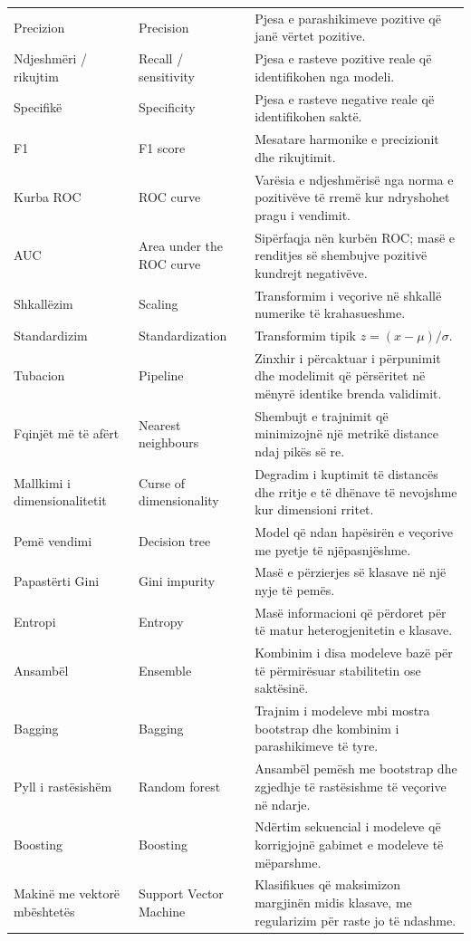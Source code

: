 \documentclass[12pt,a4paper,oneside]{book}
\begin{document}
\begin{longtable}{p{}p{}p{}}
Precizion & Precision & Pjesa e parashikimeve pozitive që janë vërtet pozitive.\\
Ndjeshmëri / rikujtim & Recall / sensitivity & Pjesa e rasteve pozitive reale që identifikohen nga modeli.\\
Specifikë & Specificity & Pjesa e rasteve negative reale që identifikohen saktë.\\
F1 & F1 score & Mesatare harmonike e precizionit dhe rikujtimit.\\
Kurba ROC & ROC curve & Varësia e ndjeshmërisë nga norma e pozitivëve të rremë kur ndryshohet pragu i vendimit.\\
AUC & Area under the ROC curve & Sipërfaqja nën kurbën ROC; masë e renditjes së shembujve pozitivë kundrejt negativëve.\\
Shkallëzim & Scaling & Transformim i veçorive në shkallë numerike të krahasueshme.\\
Standardizim & Standardization & Transformim tipik $z=(x-\mu)/\sigma$.\\
Tubacion & Pipeline & Zinxhir i përcaktuar i përpunimit dhe modelimit që përsëritet në mënyrë identike brenda validimit.\\
Fqinjët më të afërt & Nearest neighbours & Shembujt e trajnimit që minimizojnë një metrikë distance ndaj pikës së re.\\
Mallkimi i dimensionalitetit & Curse of dimensionality & Degradim i kuptimit të distancës dhe rritje e të dhënave të nevojshme kur dimensioni rritet.\\
Pemë vendimi & Decision tree & Model që ndan hapësirën e veçorive me pyetje të njëpasnjëshme.\\
Papastërti Gini & Gini impurity & Masë e përzierjes së klasave në një nyje të pemës.\\
Entropi & Entropy & Masë informacioni që përdoret për të matur heterogjenitetin e klasave.\\
Ansambël & Ensemble & Kombinim i disa modeleve bazë për të përmirësuar stabilitetin ose saktësinë.\\
Bagging & Bagging & Trajnim i modeleve mbi mostra bootstrap dhe kombinim i parashikimeve të tyre.\\
Pyll i rastësishëm & Random forest & Ansambël pemësh me bootstrap dhe zgjedhje të rastësishme të veçorive në ndarje.\\
Boosting & Boosting & Ndërtim sekuencial i modeleve që korrigjojnë gabimet e modeleve të mëparshme.\\
Makinë me vektorë mbështetës & Support Vector Machine & Klasifikues që maksimizon margjinën midis klasave, me regularizim për raste jo të ndashme.\\

\end{longtable}
\end{document}
